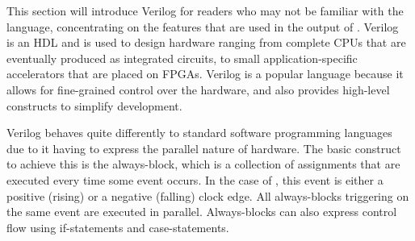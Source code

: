 This section will introduce Verilog for readers who may not be familiar with the
language, concentrating on the features that are used in the output of
\vericert{}.  Verilog~\cite{06_ieee_stand_veril_hardw_descr_languag} is an
\gls{HDL} and is used to design hardware ranging from complete CPUs that are
eventually produced as integrated circuits, to small application-specific
accelerators that are placed on FPGAs.  Verilog is a popular language because it
allows for fine-grained control over the hardware, and also provides high-level
constructs to simplify development.

Verilog behaves quite differently to standard software programming languages due
to it having to express the parallel nature of hardware.  The basic construct to
achieve this is the always-block, which is a collection of assignments that are
executed every time some event occurs.  In the case of \vericert{}, this event
is either a positive (rising) or a negative (falling) clock edge.  All
always-blocks triggering on the same event are executed in
parallel. Always-blocks can also express control flow using if-statements and
case-statements.


